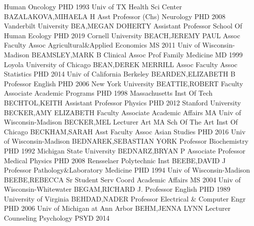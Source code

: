 \documentclass[
]{article}
\begin{document}
\textbar Human Oncology \textbar PHD 1993 Univ of TX Health Sci Center
\textbar BAZALAKOVA,MIHAELA H \textbar{}  \textbar Asst
Professor (Chs) \textbar Neurology \textbar PHD 2008 Vanderbilt
University \textbar BEA,MEGAN DOHERTY \textbar{} 
\textbar Assistant Professor \textbar School Of Human Ecology
\textbar PHD 2019 Cornell University \textbar BEACH,JEREMY PAUL
\textbar{}  \textbar Assoc Faculty Assoc
\textbar Agricultural\&Applied Economics \textbar MS 2011 Univ of
Wisconsin-Madison \textbar BEAMSLEY,MARK B \textbar{} 
\textbar Clinical Assoc Prof \textbar Family Medicine \textbar MD 1999
Loyola University of Chicago \textbar BEAN,DEREK MERRILL \textbar{}
 \textbar Assoc Faculty Assoc \textbar Statistics
\textbar PHD 2014 Univ of California Berkeley \textbar BEARDEN,ELIZABETH
B \textbar{}  \textbar Professor \textbar English
\textbar PHD 2006 New York University \textbar BEATTIE,ROBERT \textbar{}
 \textbar Faculty Associate \textbar Academic Programs
\textbar PHD 1998 Massachusetts Inst Of Tech \textbar BECHTOL,KEITH
\textbar{}  \textbar Assistant Professor \textbar Physics
\textbar PHD 2012 Stanford University \textbar BECKER,AMY ELIZABETH
\textbar{}  \textbar Faculty Associate \textbar Academic
Affairs \textbar MA Univ of Wisconsin-Madison \textbar BECKER,MEL
\textbar{}  \textbar Lecturer \textbar Art \textbar MA Sch Of
The Art Inst Of Chicago \textbar BECKHAM,SARAH \textbar{} 
\textbar Asst Faculty Assoc \textbar Asian Studies \textbar PHD 2016
Univ of Wisconsin-Madison \textbar BEDNAREK,SEBASTIAN YORK \textbar{}
 \textbar Professor \textbar Biochemistry \textbar PHD 1992
Michigan State University \textbar BEDNARZ,BRYAN P \textbar{}
 \textbar Associate Professor \textbar Medical Physics
\textbar PHD 2008 Rensselaer Polytechnic Inst \textbar BEEBE,DAVID J
\textbar{}  \textbar Professor \textbar Pathology\&Laboratory
Medicine \textbar PHD 1994 Univ of Wisconsin-Madison
\textbar BEEBE,REBECCA \textbar{}  \textbar Sr Student Serv
Coord \textbar Academic Affairs \textbar MS 2004 Univ of
Wisconsin-Whitewater \textbar BEGAM,RICHARD J. \textbar{} 
\textbar Professor \textbar English \textbar PHD 1989 University of
Virginia \textbar BEHDAD,NADER \textbar{}  \textbar Professor
\textbar Electrical \& Computer Engr \textbar PHD 2006 Univ of Michigan
at Ann Arbor \textbar BEHM,JENNA LYNN \textbar{} 
\textbar Lecturer \textbar Counseling Psychology \textbar PSYD 2014
\end{document}
